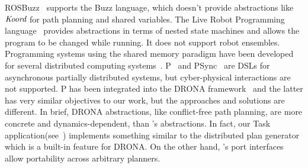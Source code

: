  ROSBuzz~\cite{ROSBuzz} supports the Buzz language, which doesn't provide abstractions like $\emph{Koord}$ for path planning and shared variables. The Live Robot Programming language~\cite{campusanofabry:lrp2016} provides abstractions in terms of nested state machines and allows the program to be changed while running. It does not support robot ensembles. Programming systems using the shared memory paradigm have been developed for several distributed computing systems~\cite{dsm1991,Adve96sharedmemory,Azure,Cassandra,Dynamo}.
%
 P~\cite{Planguage} and PSync~\cite{PSyncLanguage} are DSLs for asynchronous partially distributed systems, but cyber-physical interactions are not supported. P has been integrated into the DRONA framework~\cite{desai2017drona} and the latter has very similar objectives to our work, but the approaches and solutions are different.
 In brief, DRONA abstractions, like conflict-free path planning, are more concrete and dynamics-dependent, than \lgname's abstractions. In fact, our Task application(see~) implements something similar to the distributed plan generator which is a built-in feature for DRONA. On the other hand, \lgname's port interfaces allow portability across arbitrary planners.


